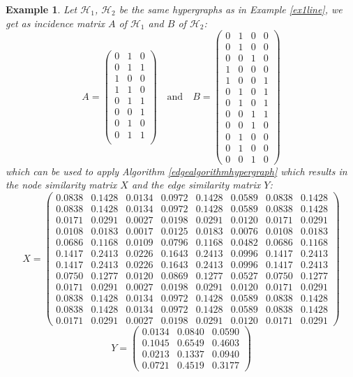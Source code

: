 \documentclass[a4paper,11pt]{report}
\newtheorem{example}[theorem]{Example}
\newcommand{\hgrafeen}{\mathcal{H}}
\begin{document}
\begin{example}
  Let $\hgrafeen_1$, $\hgrafeen_2$ be the same hypergraphs as in Example \ref{ex1line}, we get as incidence matrix $A$ of 
  $\hgrafeen_1$ and $B$ of $\hgrafeen_2$:
  $$A = \begin{pmatrix}
  0&1&0\\
0&1&1\\
1&0&0\\
1&1&0\\
0&1&1\\
0&0&1\\
0&1&0\\
0&1&1\\
\end{pmatrix} \quad \text{and} \quad
B = \begin{pmatrix}
  0&1&0&0\\
0&1&0&0\\
0&0&1&0\\
1&0&0&0\\
1&0&0&1\\
0&1&0&1\\
0&1&0&1\\
0&0&1&1\\
0&0&1&0\\
0&1&0&0\\
0&1&0&0\\
0&0&1&0
\end{pmatrix}$$
which can be used to apply Algorithm \ref{edgealgorithmhypergraph} which results in the node similarity matrix $X$ and the edge similarity matrix 
$Y$:
$$ X = \begin{pmatrix}
0.0838&0.1428&0.0134&0.0972&0.1428&0.0589&0.0838&0.1428\\
0.0838&0.1428&0.0134&0.0972&0.1428&0.0589&0.0838&0.1428\\
0.0171&0.0291&0.0027&0.0198&0.0291&0.0120&0.0171&0.0291\\
0.0108&0.0183&0.0017&0.0125&0.0183&0.0076&0.0108&0.0183\\
0.0686&0.1168&0.0109&0.0796&0.1168&0.0482&0.0686&0.1168\\
0.1417&0.2413&0.0226&0.1643&0.2413&0.0996&0.1417&0.2413\\
0.1417&0.2413&0.0226&0.1643&0.2413&0.0996&0.1417&0.2413\\
0.0750&0.1277&0.0120&0.0869&0.1277&0.0527&0.0750&0.1277\\
0.0171&0.0291&0.0027&0.0198&0.0291&0.0120&0.0171&0.0291\\
0.0838&0.1428&0.0134&0.0972&0.1428&0.0589&0.0838&0.1428\\
0.0838&0.1428&0.0134&0.0972&0.1428&0.0589&0.0838&0.1428\\
0.0171&0.0291&0.0027&0.0198&0.0291&0.0120&0.0171&0.0291
\end{pmatrix}$$
$$Y = \begin{pmatrix}
0.0134&0.0840&0.0590\\
0.1045&0.6549&0.4603\\
0.0213&0.1337&0.0940\\
0.0721&0.4519&0.3177
\end{pmatrix}$$
\end{example}
\end{document}
